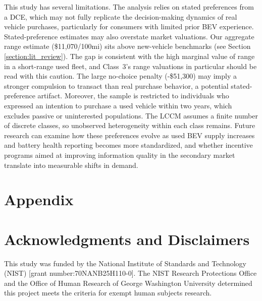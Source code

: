 \documentclass[a4paper,fleqn]{cas-sc}   %
\begin{document}
This study has several limitations. The analysis relies on stated preferences from a DCE, which may not fully replicate the decision-making dynamics of real vehicle purchases, particularly for consumers with limited prior BEV experience. Stated-preference estimates may also overstate market valuations. Our aggregate range estimate (\$11,070/100mi) sits above new-vehicle benchmarks (see Section \ref{section:lit_review}). The gap is consistent with the high marginal value of range in a short-range used fleet, and Class~3's range valuations in particular should be read with this caution. The large no-choice penalty (-\$51,300) may imply a stronger compulsion to transact than real purchase behavior, a potential stated-preference artifact. Moreover, the sample is restricted to individuals who expressed an intention to purchase a used vehicle within two years, which excludes passive or uninterested populations. The LCCM assumes a finite number of discrete classes, so unobserved heterogeneity within each class remains. Future research can examine how these preferences evolve as used BEV supply increases and battery health reporting becomes more standardized, and whether incentive programs aimed at improving information quality in the secondary market translate into measurable shifts in demand.

\section{Appendix}
\label{section:appendix}
\renewcommand{\thetable}{A.\arabic{table}}
\setcounter{table}{0}







\begin{singlespace}

\end{singlespace}

\section{Acknowledgments and Disclaimers}

This study was funded by the National Institute of Standards and Technology (NIST) [grant number:70NANB25H110-0]. The NIST Research Protections Office and the Office of Human Research of George Washington University determined this project meets the criteria for exempt human subjects research.
\end{document}
